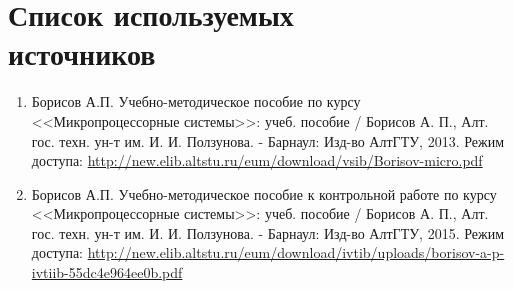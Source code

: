 \documentclass[main.tex]{subfiles}
\begin{document}
\chapter[Список используемых источников]{Список используемых\\ источников}

\begin{enumerate}
\item Борисов А.П. Учебно-методическое пособие по курсу <<Микропроцессорные системы>>: учеб. пособие / Борисов А. П., Алт. гос. техн. ун-т им. И. И. Ползунова. - Барнаул: Изд-во АлтГТУ, 2013. Режим доступа: \url{http://new.elib.altstu.ru/eum/download/vsib/Borisov-micro.pdf}
\item Борисов А.П. Учебно-методическое пособие к контрольной работе по курсу <<Микропроцессорные системы>>: учеб. пособие / Борисов А. П., Алт. гос. техн. ун-т им. И. И. Ползунова. - Барнаул: Изд-во АлтГТУ, 2015. Режим доступа: \url{http://new.elib.altstu.ru/eum/download/ivtib/uploads/borisov-a-p-ivtiib-55dc4e964ee0b.pdf}
\end{enumerate}
\end{document}
